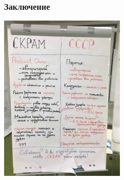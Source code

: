 \documentclass{../../slides-style}
\begin{document}
    \begin{frame}
        \frametitle{Заключение}
        \begin{center}
            \includegraphics[width=0.45\textwidth]{soviet-union.png}
        \end{center}
    \end{frame}
\end{document}
